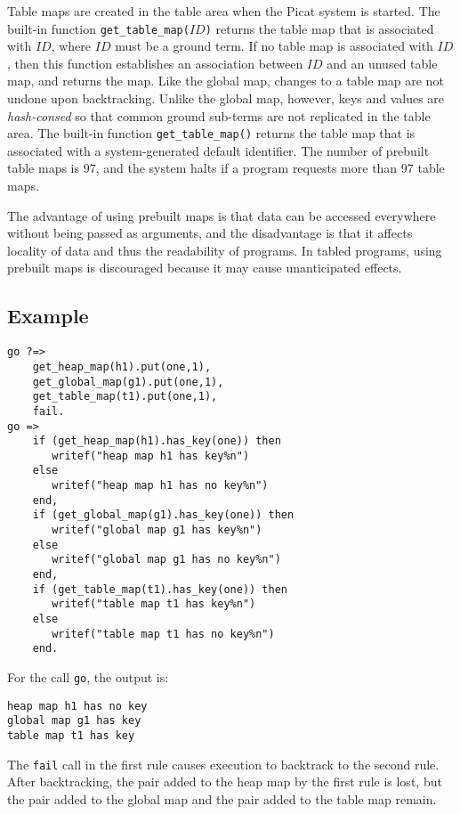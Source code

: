 Table maps  are created in the table area when the Picat system is started. The built-in function \texttt{get\_table\_map($ID$)} returns the table map that is associated with $ID$, where $ID$ must be a ground term. If no table map is associated with $ID$, then this function establishes an association between $ID$ and an unused table map, and returns the map. Like the global map, changes to a table map are not undone upon backtracking. Unlike the global map, however, keys and values are {\it hash-consed} so that common ground sub-terms are not replicated in the table area. The built-in function \texttt{get\_table\_map()} returns the table map that is associated with a system-generated default identifier. The number of prebuilt table maps is 97, and the system halts if a program requests more than 97 table maps.

The advantage of using prebuilt maps is that data can be accessed everywhere without being passed as arguments, and the disadvantage is that it affects locality of data and thus the readability of programs. In tabled programs, using prebuilt maps is discouraged because it may cause unanticipated effects.

\subsection*{Example}
\begin{verbatim}
go ?=>
    get_heap_map(h1).put(one,1),
    get_global_map(g1).put(one,1),
    get_table_map(t1).put(one,1),
    fail.
go =>
    if (get_heap_map(h1).has_key(one)) then 
       writef("heap map h1 has key%n") 
    else 
       writef("heap map h1 has no key%n")
    end,
    if (get_global_map(g1).has_key(one)) then 
       writef("global map g1 has key%n") 
    else 
       writef("global map g1 has no key%n")
    end,
    if (get_table_map(t1).has_key(one)) then 
       writef("table map t1 has key%n") 
    else 
       writef("table map t1 has no key%n")
    end.
\end{verbatim}
For the call \texttt{go}, the output is:
\begin{verbatim}
heap map h1 has no key
global map g1 has key
table map t1 has key
\end{verbatim}
The \texttt{fail} call in the first rule causes execution to backtrack to the second rule. After backtracking, the pair added to the heap map by the first rule is lost, but the pair added to the global map and the pair added to the table map remain.

